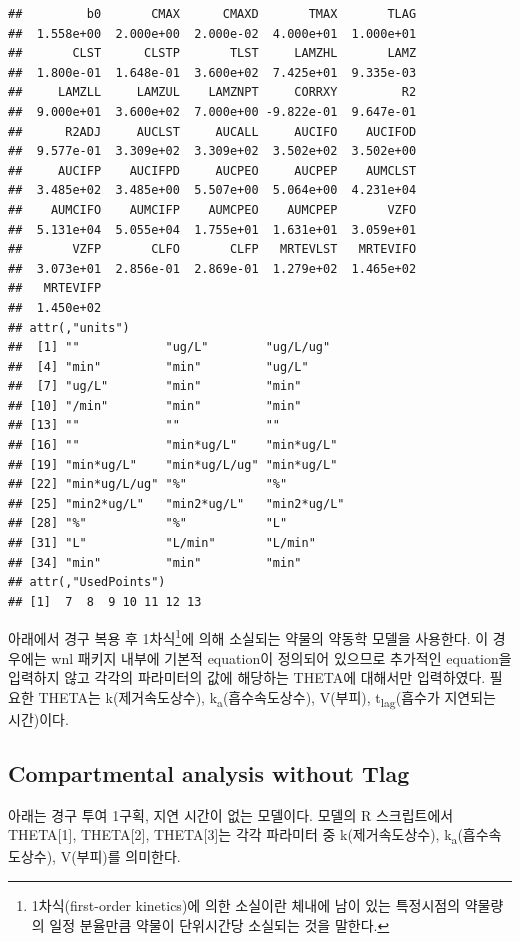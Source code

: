 \documentclass[
  11pt,
  krantz2, a4paper, twoside]{krantz}
\theoremstyle{definition}
\theoremstyle{definition}
\theoremstyle{definition}
\theoremstyle{definition}
\theoremstyle{remark}
\begin{document}
\begin{verbatim}
##         b0       CMAX      CMAXD       TMAX       TLAG 
##  1.558e+00  2.000e+00  2.000e-02  4.000e+01  1.000e+01 
##       CLST      CLSTP       TLST     LAMZHL       LAMZ 
##  1.800e-01  1.648e-01  3.600e+02  7.425e+01  9.335e-03 
##     LAMZLL     LAMZUL    LAMZNPT     CORRXY         R2 
##  9.000e+01  3.600e+02  7.000e+00 -9.822e-01  9.647e-01 
##      R2ADJ     AUCLST     AUCALL     AUCIFO    AUCIFOD 
##  9.577e-01  3.309e+02  3.309e+02  3.502e+02  3.502e+00 
##     AUCIFP    AUCIFPD     AUCPEO     AUCPEP    AUMCLST 
##  3.485e+02  3.485e+00  5.507e+00  5.064e+00  4.231e+04 
##    AUMCIFO    AUMCIFP    AUMCPEO    AUMCPEP       VZFO 
##  5.131e+04  5.055e+04  1.755e+01  1.631e+01  3.059e+01 
##       VZFP       CLFO       CLFP   MRTEVLST   MRTEVIFO 
##  3.073e+01  2.856e-01  2.869e-01  1.279e+02  1.465e+02 
##   MRTEVIFP 
##  1.450e+02 
## attr(,"units")
##  [1] ""            "ug/L"        "ug/L/ug"    
##  [4] "min"         "min"         "ug/L"       
##  [7] "ug/L"        "min"         "min"        
## [10] "/min"        "min"         "min"        
## [13] ""            ""            ""           
## [16] ""            "min*ug/L"    "min*ug/L"   
## [19] "min*ug/L"    "min*ug/L/ug" "min*ug/L"   
## [22] "min*ug/L/ug" "%"           "%"          
## [25] "min2*ug/L"   "min2*ug/L"   "min2*ug/L"  
## [28] "%"           "%"           "L"          
## [31] "L"           "L/min"       "L/min"      
## [34] "min"         "min"         "min"        
## attr(,"UsedPoints")
## [1]  7  8  9 10 11 12 13
\end{verbatim}

아래에서 경구 복용 후 1차식\footnote{1차식(first-order kinetics)에 의한 소실이란 체내에 남이 있는 특정시점의 약물량의 일정 분율만큼 약물이 단위시간당 소실되는 것을 말한다.}에 의해 소실되는 약물의 약동학 모델을 사용한다. 
이 경우에는 wnl 패키지 내부에 기본적 equation이 정의되어 있으므로 추가적인 equation을 입력하지 않고 각각의 파라미터의 값에 해당하는 THETA에 대해서만 입력하였다.
필요한 THETA는 k(제거속도상수), k\textsubscript{a}(흡수속도상수), V(부피), t\textsubscript{lag}(흡수가 지연되는 시간)이다.

\subsection{Compartmental analysis without Tlag}\label{compartmental-analysis-without-tlag}

아래는 경구 투여 1구획, 지연 시간이 없는 모델이다. 
모델의 R 스크립트에서 THETA{[}1{]}, THETA{[}2{]}, THETA{[}3{]}는 각각 파라미터 중 k(제거속도상수), k\textsubscript{a}(흡수속도상수), V(부피)를 의미한다.
\end{document}

